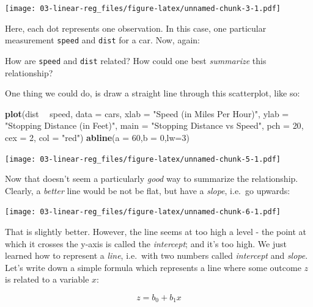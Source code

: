 \documentclass[]{book}
\newenvironment{Shaded}{\begin{snugshade}}{\end{snugshade}}
\newcommand{\KeywordTok}[1]{\textcolor[rgb]{0.13,0.29,0.53}{\textbf{#1}}}
\newcommand{\DataTypeTok}[1]{\textcolor[rgb]{0.13,0.29,0.53}{#1}}
\newcommand{\DecValTok}[1]{\textcolor[rgb]{0.00,0.00,0.81}{#1}}
\newcommand{\StringTok}[1]{\textcolor[rgb]{0.31,0.60,0.02}{#1}}
\newcommand{\OperatorTok}[1]{\textcolor[rgb]{0.81,0.36,0.00}{\textbf{#1}}}
\newcommand{\NormalTok}[1]{#1}
\newenvironment{note}{\begin{tcolorbox}[colback=blue!5!white,colframe=blue!75!black]}{\end{tcolorbox}}
\begin{document}
\texttt{[image: 03-linear-reg\_files/figure-latex/unnamed-chunk-3-1.pdf]}

Here, each dot represents one observation. In this case, one particular
measurement \texttt{speed} and \texttt{dist} for a car. Now, again:

\begin{note}
How are \texttt{speed} and \texttt{dist} related? How could one best
\emph{summarize} this relationship?
\end{note}

 One thing we could do, is draw a straight line through this
scatterplot, like so:

\begin{Shaded}
\begin{Highlighting}[]
\KeywordTok{plot}\NormalTok{(dist }\OperatorTok{~}\StringTok{ }\NormalTok{speed, }\DataTypeTok{data =}\NormalTok{ cars,}
     \DataTypeTok{xlab =} \StringTok{"Speed (in Miles Per Hour)"}\NormalTok{,}
     \DataTypeTok{ylab =} \StringTok{"Stopping Distance (in Feet)"}\NormalTok{,}
     \DataTypeTok{main =} \StringTok{"Stopping Distance vs Speed"}\NormalTok{,}
     \DataTypeTok{pch  =} \DecValTok{20}\NormalTok{,}
     \DataTypeTok{cex  =} \DecValTok{2}\NormalTok{,}
     \DataTypeTok{col  =} \StringTok{"red"}\NormalTok{)}
\KeywordTok{abline}\NormalTok{(}\DataTypeTok{a =} \DecValTok{60}\NormalTok{,}\DataTypeTok{b =} \DecValTok{0}\NormalTok{,}\DataTypeTok{lw=}\DecValTok{3}\NormalTok{)}
\end{Highlighting}
\end{Shaded}

\texttt{[image: 03-linear-reg\_files/figure-latex/unnamed-chunk-5-1.pdf]}

Now that doesn't seem a particularly \emph{good} way to summarize the
relationship. Clearly, a \emph{better} line would be not be flat, but
have a \emph{slope}, i.e.~go upwards:

\texttt{[image: 03-linear-reg\_files/figure-latex/unnamed-chunk-6-1.pdf]}

That is slightly better. However, the line seems at too high a level -
the point at which it crosses the y-axis is called the \emph{intercept};
and it's too high. We just learned how to represent a \emph{line},
i.e.~with two numbers called \emph{intercept} and \emph{slope}. Let's
write down a simple formula which represents a line where some outcome
\(z\) is related to a variable \(x\):

\begin{equation}
z = b_0 + b_1 x \label{eq:bline}
\end{equation}
\end{document}
